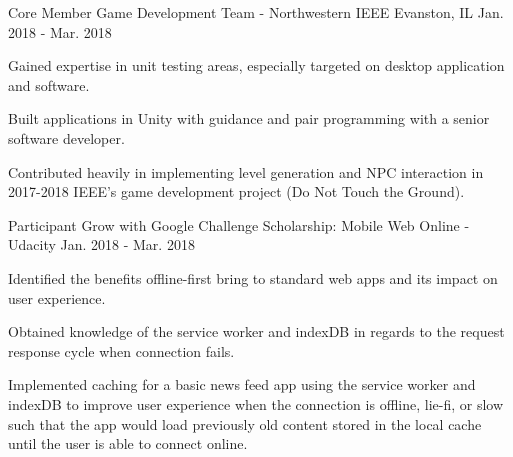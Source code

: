 

\begin{cventries}

  \cventry
    {Core Member} %
    {Game Development Team - Northwestern IEEE} %
    {Evanston, IL} %
    {Jan. 2018 - Mar. 2018} %
    {
      \begin{cvitems} %
        \item {Gained expertise in unit testing areas, especially targeted on desktop application and software.}
        \item {Built applications in Unity with guidance and pair programming with a senior software developer.}
        \item {Contributed heavily in implementing level generation and NPC interaction in 2017-2018 IEEE's game development project (Do Not Touch the Ground).}
      \end{cvitems}
    }

  \cventry
    {Participant} %
    {Grow with Google Challenge Scholarship: Mobile Web} %
    {Online - Udacity} %
    {Jan. 2018 - Mar. 2018} %
    {
      \begin{cvitems} %
        \item {Identified the benefits offline-first bring to standard web apps and its impact on user experience.}
        \item {Obtained knowledge of the service worker and indexDB in regards to the request response cycle when connection fails.}
        \item {Implemented caching for a basic news feed app using the service worker and indexDB to improve user experience when the connection is offline, lie-fi, or slow such that the app would load previously old content  stored in the local cache until the user is able to connect online.}
      \end{cvitems}
    }

\end{cventries}
